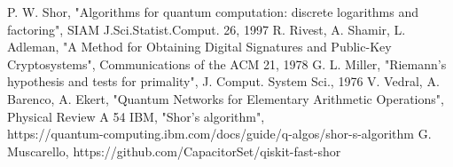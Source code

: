 \documentclass[conference]{IEEEtran}
\begin{document}
\begin{thebibliography}{00}
 P. W. Shor, "Algorithms for quantum computation: discrete logarithms and factoring", SIAM J.Sci.Statist.Comput. 26, 1997
 R. Rivest, A. Shamir, L. Adleman, "A Method for Obtaining Digital Signatures and Public-Key Cryptosystems", Communications of the ACM 21, 1978
 G. L. Miller, "Riemann's hypothesis and tests for primality", J. Comput. System Sci., 1976
 V. Vedral, A. Barenco, A. Ekert, "Quantum Networks for Elementary Arithmetic Operations", Physical Review A 54
 IBM, "Shor's algorithm",\\https://quantum-computing.ibm.com/docs/guide/q-algos/shor-s-algorithm
 G. Muscarello, https://github.com/CapacitorSet/qiskit-fast-shor
\end{thebibliography}
\vspace{12pt}
\end{document}
